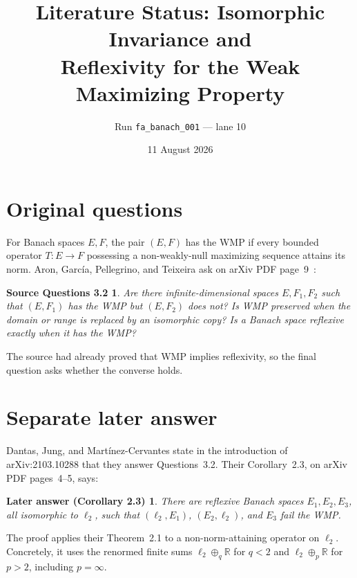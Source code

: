 \documentclass[11pt]{article}
\title{Literature Status: Isomorphic Invariance and\\
Reflexivity for the Weak Maximizing Property}
\author{Run \texttt{fa\_banach\_001} --- lane 10}
\date{11 August 2026}
\newtheorem*{questions}{Source Questions 3.2}
\newtheorem*{answer}{Later answer (Corollary 2.3)}
\begin{document}
\maketitle

\begin{center}
\end{center}

\section{Original questions}

For Banach spaces $E,F$, the pair $(E,F)$ has the WMP if every bounded
operator $T:E\to F$ possessing a non-weakly-null maximizing sequence attains
its norm.  Aron, Garc\'ia, Pellegrino, and Teixeira ask on arXiv PDF
page~9~\cite{source}:

\begin{questions}
Are there infinite-dimensional spaces $E,F_1,F_2$ such that $(E,F_1)$ has
the WMP but $(E,F_2)$ does not?  Is WMP preserved when the domain or range is
replaced by an isomorphic copy?  Is a Banach space reflexive exactly when it
has the WMP?
\end{questions}

The source had already proved that WMP implies reflexivity, so the final
question asks whether the converse holds.

\section{Separate later answer}

Dantas, Jung, and Mart\'inez-Cervantes state in the introduction of
arXiv:2103.10288 that they answer Questions~3.2.  Their Corollary~2.3, on
arXiv PDF pages~4--5, says:

\begin{answer}
There are reflexive Banach spaces $E_1,E_2,E_3$, all isomorphic to $\ell_2$,
such that $(\ell_2,E_1)$, $(E_2,\ell_2)$, and $E_3$ fail the WMP.
\end{answer}

The proof applies their Theorem~2.1 to a non-norm-attaining operator on
$\ell_2$.  Concretely, it uses the renormed finite sums
$\ell_2\oplus_q\mathbb R$ for $q<2$ and
$\ell_2\oplus_p\mathbb R$ for $p>2$, including $p=\infty$.
\end{document}
